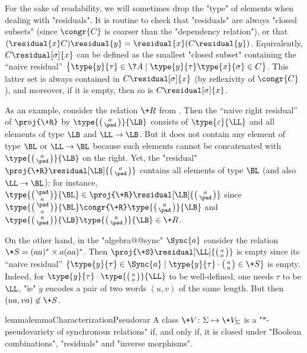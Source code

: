 For the sake of readability, we will sometimes drop the "type" of elements when dealing
with "residuals".
It is routine to check that "residuals" are always "closed subsets" (since $\congr{C}$ is coarser than the "dependency relation"), or that $(\residual{x} C)\residual{y} =
\residual{x} (C\residual{y})$.
Equivalently, $C\residual[\sigma]{x}$ can be defined as the smallest "closed subset"
containing the ``naive residual''
$\bigl\{
	\type{y}{\tau} \in \?A \mid
		\type{y}{\tau}\type{x}{\sigma} \in C
\bigr\}$.
This latter set is always contained in $C\residual[\sigma]{x}$ (by reflexivity of $\congr{C}$),
and moreover, if it is empty, then so is $C\residual[\sigma]{x}$.

As an example, consider the relation $\+R$ from .
Then the ``naive right residual'' of $\proj{\+R}$ by $\type{\pair{a}{\pad}}{\LB}$
consists of $\type{\varepsilon}{\LL}$ and all elements of type $\LB$ and $\LL\to\LB$.
But it does not contain any element of type $\BL$ or $\LL\to\BL$ because such elements cannot be concatenated with $\type{\pair{a}{\pad}}{\LB}$ on the right.
Yet, the "residual" 
$\proj{\+R} \residual[\LB]{\pair{a}{\pad}}$ contains all elements of type $\BL$ (and also $\LL\to\BL$): for instance, $\type{\pair{\pad}{a}}{\BL} \in
\proj{\+R} \residual[\LB]{\pair{a}{\pad}}$ since $\type{\pair{\pad}{a}}{\BL} \congr{\+R} \type{\pair{a}{\pad}}{\LB}$
and $\type{\pair{a}{\pad}}{\LB} \type{\pair{a}{\pad}}{\LB} \in \+R$.

On the other hand, in the "algebra@@sync" $\Sync{a}$ consider the relation
$\+S = (aa)^*\times a(aa)^*$.
Then $\proj{\+S}\residual[\LL]{\pair{a}{a}}$ is empty since its 
``naive residual'' $\{\type{y}{\tau} \in \Sync{a} \mid \type{y}{\tau}\cdot\pair{a}{a} \in \+S\}$
is empty. Indeed, for $\type{y}{\tau}\cdot\type{\pair{a}{a}}{\LL}$ to
be well-defined, one needs $\tau$ to be $\LL$, "ie" $y$ encodes a pair of
two words $(u,v)$ of the same length. But then $(ua, va) \not\in \+S$.

\begin{restatable}{lemma}{lemmaCharacterizationPseudovar}
	\AP\label{lemma:characterization-pseudovarieties-syncrel}
	A class $\+V\colon \Sigma \mapsto \+V_\Sigma$ is a "$\ast$-pseudovariety of synchronous relations" if, and only if, it is closed under "Boolean combinations", "residuals" and
	"inverse morphisms".
\end{restatable}

